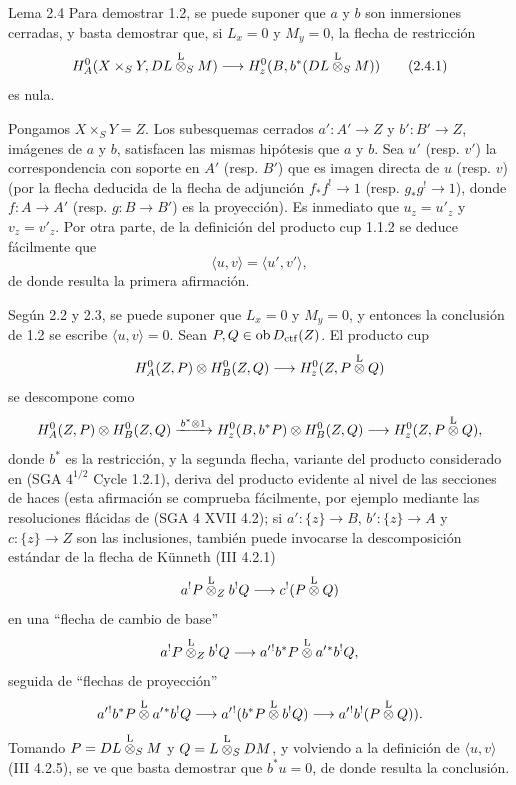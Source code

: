 \begin{statement}{Lema 2.4}
Para demostrar 1.2, se puede suponer que $a$ y $b$ son inmersiones cerradas, y basta demostrar que, si $L_x=0$ y $M_y=0$, la flecha de restricción
\begin{equation}
H_A^0(X\times_SY,DL\overset{\mathrm L}{\otimes}_SM)
 \longrightarrow H_z^0(B,b^*(DL\overset{\mathrm L}{\otimes}_SM))
\tag{2.4.1}
\end{equation}
es nula.
\end{statement}

Pongamos $X\times_SY=Z$. Los subesquemas cerrados $a':A'\to Z$ y $b':B'\to Z$, imágenes de $a$ y $b$, satisfacen las mismas hipótesis que $a$ y $b$. Sea $u'$ (resp. $v'$) la correspondencia con soporte en $A'$ (resp. $B'$) que es imagen directa de $u$ (resp. $v$) (por la flecha deducida de la flecha de adjunción $f_*f^!\to 1$ (resp. $g_*g^!\to 1$), donde $f:A\to A'$ (resp. $g:B\to B'$) es la proyección). Es inmediato que $u_z=u'_z$ y $v_z=v'_z$. Por otra parte, de la definición del producto cup 1.1.2 se deduce fácilmente que
\[
\langle u,v\rangle=\langle u',v'\rangle,
\]
de donde resulta la primera afirmación.

Según 2.2 y 2.3, se puede suponer que $L_x=0$ y $M_y=0$, y entonces la conclusión de 1.2 se escribe $\langle u,v\rangle=0$. Sean $P,Q\in\operatorname{ob} D_{\mathrm{ctf}}(Z)$. El producto cup
\[
H_A^0(Z,P)\otimes H_B^0(Z,Q)\longrightarrow H_z^0(Z,P\overset{\mathrm L}{\otimes} Q)
\]
se descompone como
\[
H_A^0(Z,P)\otimes H_B^0(Z,Q)
 \xrightarrow{\,b^*\otimes 1\,}
H_z^0(B,b^*P)\otimes H_B^0(Z,Q)
 \longrightarrow H_z^0(Z,P\overset{\mathrm L}{\otimes} Q),
\]
donde $b^*$ es la restricción, y la segunda flecha, variante del producto considerado en (SGA $4^{1/2}$ Cycle 1.2.1), deriva del producto evidente al nivel de las secciones de haces (esta afirmación se comprueba fácilmente, por ejemplo mediante las resoluciones flácidas de (SGA 4 XVII 4.2); si $a':\{z\}\to B$, $b':\{z\}\to A$ y $c:\{z\}\to Z$ son las inclusiones, también puede invocarse la descomposición estándar de la flecha de Künneth (III 4.2.1)
\[
a^!P\overset{\mathrm L}{\otimes}_Z b^!Q\longrightarrow c^!(P\overset{\mathrm L}{\otimes} Q)
\]
en una ``flecha de cambio de base''
\[
a^!P\overset{\mathrm L}{\otimes}_Z b^!Q\longrightarrow a'{}^!b^*P\overset{\mathrm L}{\otimes} a'{}^*b^!Q,
\]
seguida de ``flechas de proyección''
\[
a'{}^!b^*P\overset{\mathrm L}{\otimes} a'{}^*b^!Q
 \longrightarrow a'{}^!(b^*P\overset{\mathrm L}{\otimes} b^!Q)
 \longrightarrow a'{}^!b^!(P\overset{\mathrm L}{\otimes} Q)).
\]
Tomando $P=DL\overset{\mathrm L}{\otimes}_SM$ y $Q=L\overset{\mathrm L}{\otimes}_SDM$, y volviendo a la definición de $\langle u,v\rangle$ (III 4.2.5), se ve que basta demostrar que $b^*u=0$, de donde resulta la conclusión.
